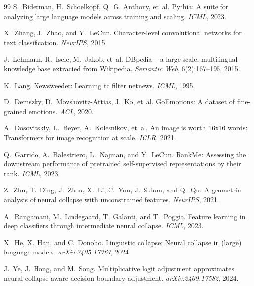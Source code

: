 \documentclass{article}
\begin{document}
\begin{thebibliography}{99}
S.~Biderman, H.~Schoelkopf, Q.~G. Anthony, et~al.
\newblock Pythia: A suite for analyzing large language models across training and scaling.
\newblock \emph{ICML}, 2023.

X.~Zhang, J.~Zhao, and Y.~LeCun.
\newblock Character-level convolutional networks for text classification.
\newblock \emph{NeurIPS}, 2015.

J.~Lehmann, R.~Isele, M.~Jakob, et~al.
\newblock DBpedia -- a large-scale, multilingual knowledge base extracted from Wikipedia.
\newblock \emph{Semantic Web}, 6(2):167--195, 2015.

K.~Lang.
\newblock Newsweeder: Learning to filter netnews.
\newblock \emph{ICML}, 1995.

D.~Demszky, D.~Movshovitz-Attias, J.~Ko, et~al.
\newblock GoEmotions: A dataset of fine-grained emotions.
\newblock \emph{ACL}, 2020.

A.~Dosovitskiy, L.~Beyer, A.~Kolesnikov, et~al.
\newblock An image is worth 16x16 words: Transformers for image recognition at scale.
\newblock \emph{ICLR}, 2021.

Q.~Garrido, A.~Balestriero, L.~Najman, and Y.~LeCun.
\newblock RankMe: Assessing the downstream performance of pretrained self-supervised representations by their rank.
\newblock \emph{ICML}, 2023.

Z.~Zhu, T.~Ding, J.~Zhou, X.~Li, C.~You, J.~Sulam, and Q.~Qu.
\newblock A geometric analysis of neural collapse with unconstrained features.
\newblock \emph{NeurIPS}, 2021.

A.~Rangamani, M.~Lindegaard, T.~Galanti, and T.~Poggio.
\newblock Feature learning in deep classifiers through intermediate neural collapse.
\newblock \emph{ICML}, 2023.

X.~He, X.~Han, and C.~Donoho.
\newblock Linguistic collapse: Neural collapse in (large) language models.
\newblock \emph{arXiv:2405.17767}, 2024.

J.~Ye, J.~Hong, and M.~Song.
\newblock Multiplicative logit adjustment approximates neural-collapse-aware decision boundary adjustment.
\newblock \emph{arXiv:2409.17582}, 2024.


\end{thebibliography}
\end{document}
